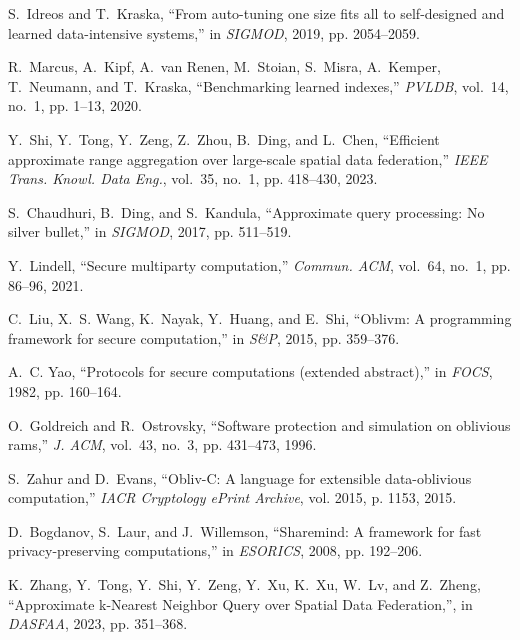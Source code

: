 \documentclass[11pt]{article}
\begin{document}
\begin{thebibliography}{10}
S.~Idreos and T.~Kraska, ``From auto-tuning one size fits all to self-designed
  and learned data-intensive systems,'' in \emph{{SIGMOD}}, 2019, pp.
  2054--2059.

R.~Marcus, A.~Kipf, A.~van Renen, M.~Stoian, S.~Misra, A.~Kemper, T.~Neumann,
  and T.~Kraska, ``Benchmarking learned indexes,'' \emph{{PVLDB}}, vol.~14,
  no.~1, pp. 1--13, 2020.

Y.~Shi, Y.~Tong, Y.~Zeng, Z.~Zhou, B.~Ding, and L.~Chen, ``Efficient
  approximate range aggregation over large-scale spatial data federation,''
  \emph{{IEEE} Trans. Knowl. Data Eng.}, vol.~35, no.~1, pp. 418--430, 2023.

S.~Chaudhuri, B.~Ding, and S.~Kandula, ``Approximate query processing: No
  silver bullet,'' in \emph{{SIGMOD}}, 2017, pp. 511--519.

Y.~Lindell, ``Secure multiparty computation,'' \emph{Commun. {ACM}}, vol.~64,
  no.~1, pp. 86--96, 2021.

C.~Liu, X.~S. Wang, K.~Nayak, Y.~Huang, and E.~Shi, ``Oblivm: {A} programming
  framework for secure computation,'' in \emph{{S\&P}}, 2015, pp. 359--376.

A.~C. Yao, ``Protocols for secure computations (extended abstract),'' in
  \emph{{FOCS}}, 1982, pp. 160--164.

O.~Goldreich and R.~Ostrovsky, ``Software protection and simulation on
  oblivious rams,'' \emph{J. {ACM}}, vol.~43, no.~3, pp. 431--473, 1996.

S.~Zahur and D.~Evans, ``{Obliv-C}: {A} language for extensible data-oblivious
  computation,'' \emph{{IACR} Cryptology ePrint Archive}, vol. 2015, p. 1153,
  2015.

D.~Bogdanov, S.~Laur, and J.~Willemson, ``Sharemind: {A} framework for fast
  privacy-preserving computations,'' in \emph{{ESORICS}}, 2008, pp. 192--206.

K.~Zhang, Y.~Tong, Y.~Shi, Y.~Zeng, Y.~Xu, K.~Xu, W.~Lv, and Z.~Zheng, ``Approximate k-Nearest Neighbor Query over Spatial Data Federation,'', in \emph{{DASFAA}}, 2023, pp. 351--368.


\end{thebibliography}
\end{document}
